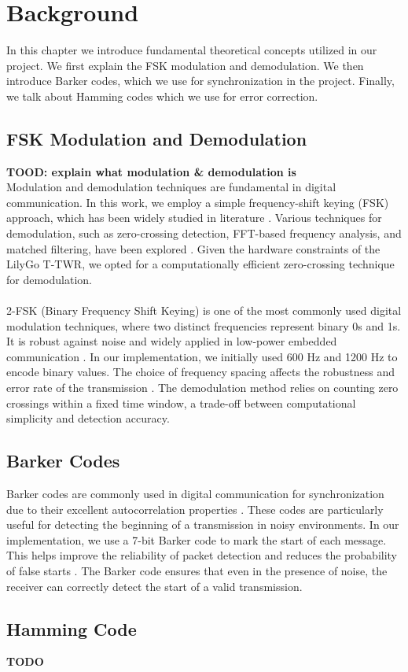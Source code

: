 \chapter{Background}
In this chapter we introduce fundamental theoretical concepts utilized in our project. We first explain the FSK modulation and demodulation. We then introduce Barker codes, which we use for synchronization in the project. Finally, we talk about Hamming codes which we use for error correction.

\section{FSK Modulation and Demodulation}
\textbf{TOOD: explain what modulation \& demodulation is} \\ 
Modulation and demodulation techniques are fundamental in digital communication. In this work, we employ a simple frequency-shift keying (FSK) approach, which has been widely studied in literature \cite{sklar2001digital}. Various techniques for demodulation, such as zero-crossing detection, FFT-based frequency analysis, and matched filtering, have been explored \cite{proakis2001digital}. Given the hardware constraints of the LilyGo T-TWR, we opted for a computationally efficient zero-crossing technique for demodulation.
\\ \\ 
2-FSK (Binary Frequency Shift Keying) is one of the most commonly used digital modulation techniques, where two distinct frequencies represent binary 0s and 1s. It is robust against noise and widely applied in low-power embedded communication \cite{anderson1995fsk}. In our implementation, we initially used 600 Hz and 1200 Hz to encode binary values. The choice of frequency spacing affects the robustness and error rate of the transmission \cite{feher1983wireless}. The demodulation method relies on counting zero crossings within a fixed time window, a trade-off between computational simplicity and detection accuracy.

\section{Barker Codes}
Barker codes are commonly used in digital communication for synchronization due to their excellent autocorrelation properties \cite{golomb1961barker}. These codes are particularly useful for detecting the beginning of a transmission in noisy environments. In our implementation, we use a 7-bit Barker code to mark the start of each message. This helps improve the reliability of packet detection and reduces the probability of false starts \cite{turin1974barker}. The Barker code ensures that even in the presence of noise, the receiver can correctly detect the start of a valid transmission. \\

\section{Hamming Code}
\textbf{TODO}
